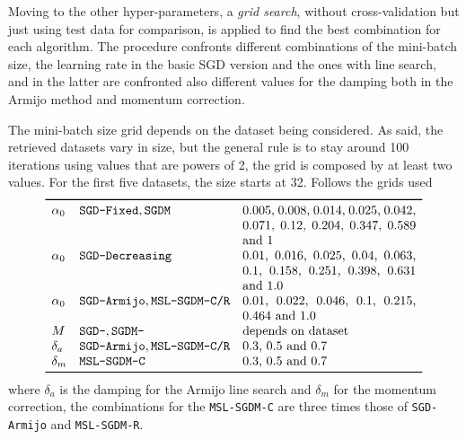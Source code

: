 Moving to the other hyper-parameters, a \emph{grid search}, without cross-validation but just using test data for comparison, is applied to find the best combination for each algorithm. The procedure confronts different combinations of the mini-batch size, the learning rate in the basic SGD version and the ones with line search, and in the latter are confronted also different values for the damping both in the Armijo method and momentum correction.

The mini-batch size grid depends on the dataset being considered. As said, the retrieved datasets vary in size, but the general rule is to stay around 100 iterations using values that are powers of 2, the grid is composed by at least two values. For the first five datasets, the size starts at 32. Follows the grids used
\[
\begin{array}{llp{0.4\textwidth}}
\toprule
\alpha_0 & \text{\texttt{SGD-Fixed}}, \text{\texttt{SGDM}} & \numlist{0.005;0.008;0.014;0.025;0.042;0.071;0.12;0.204;0.347;0.589;1} \\
\alpha_0 & \text{\texttt{SGD-Decreasing}} & \numlist{0.01;0.016;0.025;0.04;0.063;0.1;0.158;0.251;0.398;0.631;1.0} \\
\alpha_0 & \text{\texttt{SGD-Armijo}}, \text{\texttt{MSL-SGDM-C/R}} & \numlist{0.01;0.022;0.046;0.1;0.215;0.464;1.0} \\
M & \text{\texttt{SGD-}}, \text{\texttt{SGDM-}} & \text{depends on dataset} \\
\delta_a & \text{\texttt{SGD-Armijo}}, \text{\texttt{MSL-SGDM-C/R}} & \numlist{0.3;0.5;0.7} \\
\delta_m & \text{\texttt{MSL-SGDM-C}} & \numlist{0.3; 0.5; 0.7} \\
\bottomrule
\end{array}
\]
where $\delta_a$ is the damping for the Armijo line search and $\delta_m$ for the momentum correction, the combinations for the \texttt{MSL-SGDM-C} are three times those of \texttt{SGD-Armijo} and \texttt{MSL-SGDM-R}.

